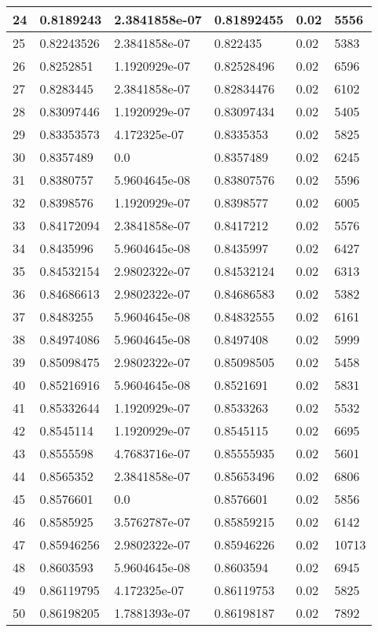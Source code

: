 \begin{longtable}{|l|l|l|l|l|l|}
24 & 0.8189243 & 2.3841858e-07 & 0.81892455 & 0.02 & 5556 \\ \hline 
25 & 0.82243526 & 2.3841858e-07 & 0.822435 & 0.02 & 5383 \\ \hline 
26 & 0.8252851 & 1.1920929e-07 & 0.82528496 & 0.02 & 6596 \\ \hline 
27 & 0.8283445 & 2.3841858e-07 & 0.82834476 & 0.02 & 6102 \\ \hline 
28 & 0.83097446 & 1.1920929e-07 & 0.83097434 & 0.02 & 5405 \\ \hline 
29 & 0.83353573 & 4.172325e-07 & 0.8335353 & 0.02 & 5825 \\ \hline 
30 & 0.8357489 & 0.0 & 0.8357489 & 0.02 & 6245 \\ \hline 
31 & 0.8380757 & 5.9604645e-08 & 0.83807576 & 0.02 & 5596 \\ \hline 
32 & 0.8398576 & 1.1920929e-07 & 0.8398577 & 0.02 & 6005 \\ \hline 
33 & 0.84172094 & 2.3841858e-07 & 0.8417212 & 0.02 & 5576 \\ \hline 
34 & 0.8435996 & 5.9604645e-08 & 0.8435997 & 0.02 & 6427 \\ \hline 
35 & 0.84532154 & 2.9802322e-07 & 0.84532124 & 0.02 & 6313 \\ \hline 
36 & 0.84686613 & 2.9802322e-07 & 0.84686583 & 0.02 & 5382 \\ \hline 
37 & 0.8483255 & 5.9604645e-08 & 0.84832555 & 0.02 & 6161 \\ \hline 
38 & 0.84974086 & 5.9604645e-08 & 0.8497408 & 0.02 & 5999 \\ \hline 
39 & 0.85098475 & 2.9802322e-07 & 0.85098505 & 0.02 & 5458 \\ \hline 
40 & 0.85216916 & 5.9604645e-08 & 0.8521691 & 0.02 & 5831 \\ \hline 
41 & 0.85332644 & 1.1920929e-07 & 0.8533263 & 0.02 & 5532 \\ \hline 
42 & 0.8545114 & 1.1920929e-07 & 0.8545115 & 0.02 & 6695 \\ \hline 
43 & 0.8555598 & 4.7683716e-07 & 0.85555935 & 0.02 & 5601 \\ \hline 
44 & 0.8565352 & 2.3841858e-07 & 0.85653496 & 0.02 & 6806 \\ \hline 
45 & 0.8576601 & 0.0 & 0.8576601 & 0.02 & 5856 \\ \hline 
46 & 0.8585925 & 3.5762787e-07 & 0.85859215 & 0.02 & 6142 \\ \hline 
47 & 0.85946256 & 2.9802322e-07 & 0.85946226 & 0.02 & 10713 \\ \hline 
48 & 0.8603593 & 5.9604645e-08 & 0.8603594 & 0.02 & 6945 \\ \hline 
49 & 0.86119795 & 4.172325e-07 & 0.86119753 & 0.02 & 5825 \\ \hline 
50 & 0.86198205 & 1.7881393e-07 & 0.86198187 & 0.02 & 7892 \\ \hline 
\end{longtable}